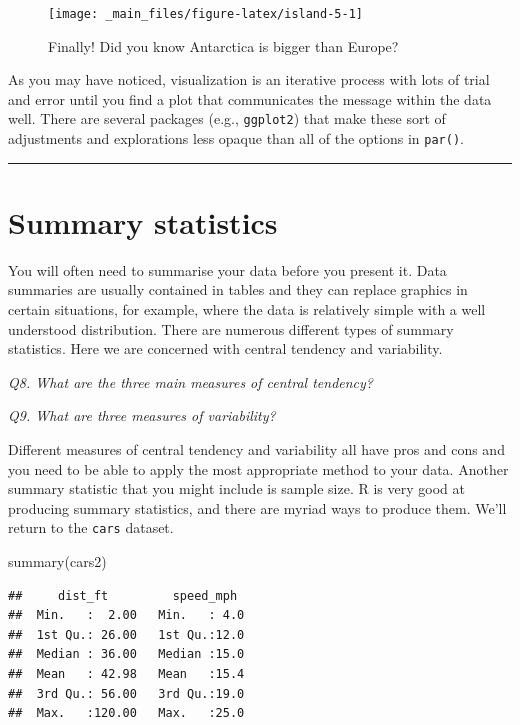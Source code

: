 \documentclass[
  11pt,
  a4paper,
]{book}
\newenvironment{Shaded}{\begin{snugshade}}{\end{snugshade}}
\newcommand{\FunctionTok}[1]{\textcolor[rgb]{0.00,0.00,0.00}{#1}}
\newcommand{\NormalTok}[1]{#1}
\begin{document}
\begin{figure}

{\centering \texttt{[image: \_main\_files/figure-latex/island-5-1]} 

}

\caption{Finally! Did you know Antarctica is bigger than Europe?}\label{fig:island-5}
\end{figure}

As you may have noticed, visualization is an iterative process with lots of trial and error until you find a plot that communicates the message within the data well. There are several packages (e.g., \texttt{ggplot2}) that make these sort of adjustments and explorations less opaque than all of the options in \texttt{par()}.

\begin{center}\rule{0.5\linewidth}{0.5pt}\end{center}

\hypertarget{summary-statistics}{%
\section{Summary statistics}\label{summary-statistics}}

You will often need to summarise your data before you present it. Data summaries are usually contained in tables and they can replace graphics in certain situations, for example, where the data is relatively simple with a well understood distribution. There are numerous different types of summary statistics. Here we are concerned with central tendency and variability.

\emph{Q8. What are the three main measures of central tendency?}

\emph{Q9. What are three measures of variability?}

Different measures of central tendency and variability all have pros and cons and you need to be able to apply the most appropriate method to your data. Another summary statistic that you might include is sample size. R is very good at producing summary statistics, and there are myriad ways to produce them. We'll return to the \texttt{cars} dataset.

\begin{Shaded}
\begin{Highlighting}[]
\FunctionTok{summary}\NormalTok{(cars2) }
\end{Highlighting}
\end{Shaded}

\begin{verbatim}
##     dist_ft         speed_mph   
##  Min.   :  2.00   Min.   : 4.0  
##  1st Qu.: 26.00   1st Qu.:12.0  
##  Median : 36.00   Median :15.0  
##  Mean   : 42.98   Mean   :15.4  
##  3rd Qu.: 56.00   3rd Qu.:19.0  
##  Max.   :120.00   Max.   :25.0
\end{verbatim}
\end{document}

